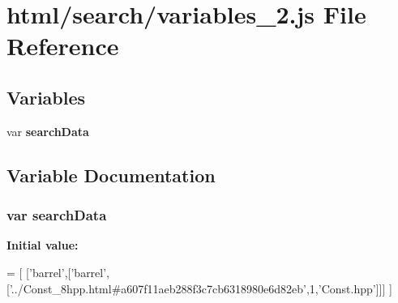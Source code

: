 \section{html/search/variables\-\_\-2.js File Reference}
\label{variables__2_8js}
\subsection*{Variables}
\begin{DoxyCompactItemize}
\item 
var {\bf search\-Data}
\end{DoxyCompactItemize}


\subsection{Variable Documentation}
\subsubsection[{search\-Data}]{\setlength{\rightskip}{0pt plus 5cm}var search\-Data}\label{variables__2_8js_ad01a7523f103d6242ef9b0451861231e}
{\bfseries Initial value\-:}
\begin{DoxyCode}
=
[
  [\textcolor{stringliteral}{'barrel'},[\textcolor{stringliteral}{'barrel'},[\textcolor{stringliteral}{'../Const\_8hpp.html#a607f11aeb288f3c7cb6318980e6d82eb'},1,\textcolor{stringliteral}{'Const.hpp'}]]]
]
\end{DoxyCode}
